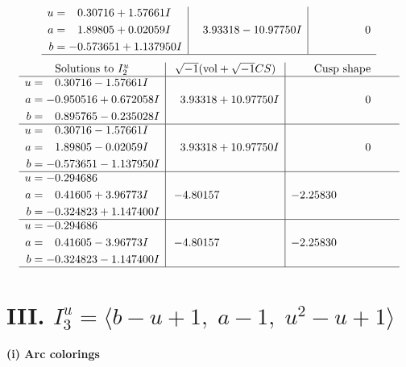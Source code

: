 \documentclass[1p]{elsarticle_modified}
\theoremstyle{definition}
\newcommand{\I}{\sqrt{-1}}
\begin{document}
$$\begin{array}{c|c|c}
\begin{aligned}
u &= \phantom{-}0.30716 + 1.57661 I \\
a &= \phantom{-}1.89805 + 0.02059 I \\
b &= -0.573651 + 1.137950 I\end{aligned}
 & \phantom{-}3.93318 - 10.97750 I & \phantom{-0.000000 } 0\\
 \hline 
 \end{array}$$\newpage$$\begin{array}{c|c|c}  
\text{Solutions to }I^u_{2}& \I (\text{vol} + \sqrt{-1}CS) & \text{Cusp shape}\\
 \hline 
\begin{aligned}
u &= \phantom{-}0.30716 - 1.57661 I \\
a &= -0.950516 + 0.672058 I \\
b &= \phantom{-}0.895765 - 0.235028 I\end{aligned}
 & \phantom{-}3.93318 + 10.97750 I & \phantom{-0.000000 } 0 \\ \hline\begin{aligned}
u &= \phantom{-}0.30716 - 1.57661 I \\
a &= \phantom{-}1.89805 - 0.02059 I \\
b &= -0.573651 - 1.137950 I\end{aligned}
 & \phantom{-}3.93318 + 10.97750 I & \phantom{-0.000000 } 0 \\ \hline\begin{aligned}
u &= -0.294686\phantom{ +0.000000I} \\
a &= \phantom{-}0.41605 + 3.96773 I \\
b &= -0.324823 + 1.147400 I\end{aligned}
 & -4.80157\phantom{ +0.000000I} & -2.25830\phantom{ +0.000000I} \\ \hline\begin{aligned}
u &= -0.294686\phantom{ +0.000000I} \\
a &= \phantom{-}0.41605 - 3.96773 I \\
b &= -0.324823 - 1.147400 I\end{aligned}
 & -4.80157\phantom{ +0.000000I} & -2.25830\phantom{ +0.000000I}\\
 \hline 
 \end{array}$$\newpage\newpage\renewcommand{\arraystretch}{1}
\centering \section*{III. $I^u_{3}= \langle b- u+1,\;a-1,\;u^2- u+1 \rangle$}
\flushleft \textbf{(i) Arc colorings}\\
\end{document}
